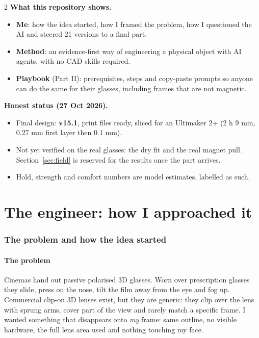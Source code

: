 \documentclass[10pt,a4paper,oneside]{article}
\begin{document}

\begin{multicols}{2}\small
\textbf{\sffamily What this repository shows.}
\begin{itemize}
\item \textbf{Me}: how the idea started, how I framed the problem, how I questioned the AI and steered 21 versions to a final part.
\item \textbf{Method}: an evidence-first way of engineering a physical object with AI agents, with no CAD skills required.
\item \textbf{Playbook} (Part II): prerequisites, steps and copy-paste prompts so anyone can do the same for their glasses, including frames that are not magnetic.
\end{itemize}
\columnbreak
\textbf{\sffamily Honest status (27 Oct 2026).}
\begin{itemize}
\item Final design: \textbf{v15.1}, print files ready, sliced for an Ultimaker 2+ (2 h 9 min, 0.27 mm first layer then 0.1 mm).
\item Not yet verified on the real glasses: the dry fit and the real magnet pull. Section~\ref{sec:field} is reserved for the results once the part arrives.
\item Hold, strength and comfort numbers are model estimates, labelled as such.
\end{itemize}
\end{multicols}

\newpage
{\hypersetup{linkcolor=navy}\sffamily\tableofcontents}
\newpage

\clearpage\part{The engineer: how I approached it}

\section{The problem and how the idea started}
\subsection{The problem}
Cinemas hand out passive polarised 3D glasses. Worn over prescription glasses they slide, press on the nose, tilt the film away from the eye and
fog up. Commercial clip-on 3D lenses exist, but they are generic: they clip over the lens with sprung arms, cover part of the view and rarely match
a specific frame. I wanted something that disappears onto \emph{my} frame: same outline, no visible hardware, the full lens area used and
nothing touching my face.
\end{document}
